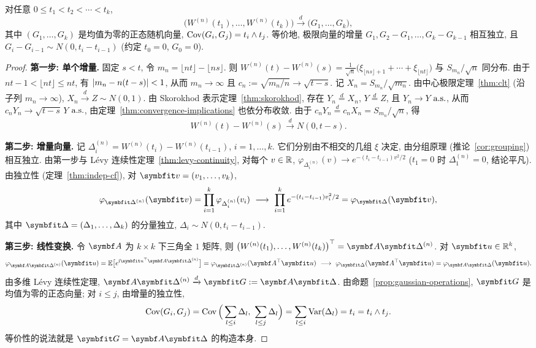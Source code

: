 \begin{proposition}[缩放随机游动的有限维分布收敛]\label{prop:rw-fdd}
对任意 $0\le t_1<t_2<\cdots<t_k$,
\[
\big(W^{(n)}(t_1),\dots,W^{(n)}(t_k)\big)\xrightarrow{d}\big(G_1,\dots,G_k\big),
\]
其中 $(G_1,\dots,G_k)$ 是均值为零的正态随机向量, $\operatorname{Cov}(G_i,G_j)=t_i\wedge t_j$. 等价地, 极限向量的增量 $G_1,G_2-G_1,\dots,G_k-G_{k-1}$ 相互独立, 且 $G_i-G_{i-1}\sim N(0,t_i-t_{i-1})$ (约定 $t_0=0$, $G_0=0$).
\end{proposition}

\begin{proof}
\textbf{第一步: 单个增量.} 固定 $s<t$, 令 $m_n=\lfloor nt\rfloor-\lfloor ns\rfloor$. 则 $W^{(n)}(t)-W^{(n)}(s)=\frac{1}{\sqrt{n}}\big(\xi_{\lfloor ns\rfloor+1}+\cdots+\xi_{\lfloor nt\rfloor}\big)$ 与 $S_{m_n}/\sqrt{n}$ 同分布. 由于 $nt-1<\lfloor nt\rfloor\le nt$, 有 $\lvert m_n-n(t-s)\rvert<1$, 从而 $m_n\to\infty$ 且 $c_n:=\sqrt{m_n/n}\to\sqrt{t-s}$. 记 $X_n=S_{m_n}/\sqrt{m_n}$. 由中心极限定理~\ref{thm:clt} (沿子列 $m_n\to\infty$), $X_n\xrightarrow{d}Z\sim N(0,1)$. 由 Skorokhod 表示定理~\ref{thm:skorokhod}, 存在 $Y_n\overset{d}{=}X_n$, $Y\overset{d}{=}Z$, 且 $Y_n\to Y$ $\text{a.s.}$, 从而 $c_nY_n\to\sqrt{t-s}\,Y$ $\text{a.s.}$, 由定理~\ref{thm:convergence-implications} 也依分布收敛. 由于 $c_nY_n\overset{d}{=}c_nX_n=S_{m_n}/\sqrt{n}$, 得
\[
W^{(n)}(t)-W^{(n)}(s)\xrightarrow{d}N(0,t-s).
\]

\textbf{第二步: 增量向量.} 记 $\Delta^{(n)}_i=W^{(n)}(t_i)-W^{(n)}(t_{i-1})$, $i=1,\dots,k$. 它们分别由不相交的几组 $\xi$ 决定, 由分组原理 (推论~\ref{cor:grouping}) 相互独立. 由第一步与 L\'evy 连续性定理~\ref{thm:levy-continuity}, 对每个 $v\in\mathbb{R}$, $\varphi_{\Delta^{(n)}_i}(v)\to e^{-(t_i-t_{i-1})v^2/2}$ ($t_1=0$ 时 $\Delta^{(n)}_1=0$, 结论平凡). 由独立性 (定理~\ref{thm:indep-cf}), 对 $\rvec{v}=(v_1,\dots,v_k)$,
\[
\varphi_{\rvec{\Delta}^{(n)}}(\rvec{v})=\prod_{i=1}^k\varphi_{\Delta^{(n)}_i}(v_i)\ \longrightarrow\ \prod_{i=1}^ke^{-(t_i-t_{i-1})v_i^2/2}=\varphi_{\rvec{\Delta}}(\rvec{v}),
\]
其中 $\rvec{\Delta}=(\Delta_1,\dots,\Delta_k)$ 的分量独立, $\Delta_i\sim N(0,t_i-t_{i-1})$.

\textbf{第三步: 线性变换.} 令 $\mat{A}$ 为 $k\times k$ 下三角全 $1$ 矩阵, 则 $\big(W^{(n)}(t_1),\dots,W^{(n)}(t_k)\big)^\T=\mat{A}\rvec{\Delta}^{(n)}$. 对 $\rvec{u}\in\R^k$,
\[
\varphi_{\mat{A}\rvec{\Delta}^{(n)}}(\rvec{u})=\E\big[e^{\mathrm{i}\rvec{u}^\T\mat{A}\rvec{\Delta}^{(n)}}\big]=\varphi_{\rvec{\Delta}^{(n)}}(\mat{A}^\T\rvec{u})\ \longrightarrow\ \varphi_{\rvec{\Delta}}(\mat{A}^\T\rvec{u})=\varphi_{\mat{A}\rvec{\Delta}}(\rvec{u}).
\]
由多维 L\'evy 连续性定理, $\mat{A}\rvec{\Delta}^{(n)}\xrightarrow{d}\rvec{G}:=\mat{A}\rvec{\Delta}$. 由命题~\ref{prop:gaussian-operations}, $\rvec{G}$ 是均值为零的正态向量; 对 $i\le j$, 由增量的独立性,
\[
\Cov(G_i,G_j)=\Cov\Big(\sum_{l\le i}\Delta_l,\ \sum_{l\le j}\Delta_l\Big)=\sum_{l\le i}\Var(\Delta_l)=t_i=t_i\wedge t_j.
\]
等价性的说法就是 $\rvec{G}=\mat{A}\rvec{\Delta}$ 的构造本身.
\end{proof}

